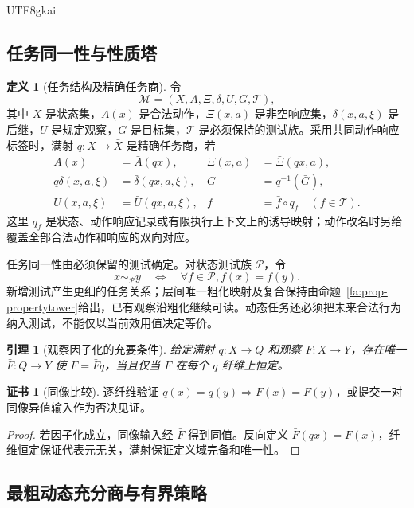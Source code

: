\documentclass[11pt,a4paper]{article}
\theoremstyle{plain}
\newtheorem{lemma}[theorem]{引理}
\theoremstyle{definition}
\newtheorem{definition}[theorem]{定义}
\newtheorem*{certificate}{证书}
\theoremstyle{remark}
\begin{document}
\begin{CJK*}{UTF8}{gkai}
\subsection{任务同一性与性质塔}

\begin{definition}[任务结构及精确任务商]
令
\[
 \mathcal M=(X,A,\Xi,\delta,U,G,\mathcal T),
\]
其中 $X$ 是状态集，$A(x)$ 是合法动作，$\Xi(x,a)$ 是非空响应集，$\delta(x,a,\xi)$ 是后继，$U$ 是规定观察，$G$ 是目标集，$\mathcal T$ 是必须保持的测试族。采用共同动作响应标签时，满射 $q:X\to\bar X$ 是精确任务商，若
\begin{equation}
\label{pc:eq-exact}
\begin{aligned}
 A(x)&=\bar A(qx),& \Xi(x,a)&=\bar\Xi(qx,a),\\
 q\delta(x,a,\xi)&=\bar\delta(qx,a,\xi),& G&=q^{-1}(\bar G),\\
 U(x,a,\xi)&=\bar U(qx,a,\xi),& f&=\bar f\circ q_f\quad(f\in\mathcal T).
\end{aligned}
\end{equation}
这里 $q_f$ 是状态、动作响应记录或有限执行上下文上的诱导映射；动作改名时另给覆盖全部合法动作和响应的双向对应。
\end{definition}

任务同一性由必须保留的测试确定。对状态测试族 $\mathcal P$，令
\[
 x\sim_{\mathcal P}y\quad\Longleftrightarrow\quad
 \forall f\in\mathcal P, f(x)=f(y).
\]
新增测试产生更细的任务关系；层间唯一粗化映射及复合保持由命题~\ref{fa:prop-propertytower}给出，已有观察沿粗化继续可读。动态任务还必须把未来合法行为纳入测试，不能仅以当前效用值决定等价。

\begin{lemma}[观察因子化的充要条件]
\label{pc:factorization}
给定满射 $q:X\to Q$ 和观察 $F:X\to Y$，存在唯一 $\bar F:Q\to Y$ 使 $F=\bar Fq$，当且仅当 $F$ 在每个 $q$ 纤维上恒定。
\end{lemma}
\begin{certificate}[同像比较]
逐纤维验证 $q(x)=q(y)\Rightarrow F(x)=F(y)$，或提交一对同像异值输入作为否决见证。
\end{certificate}
\begin{proof}
若因子化成立，同像输入经 $\bar F$ 得到同值。反向定义 $\bar F(qx)=F(x)$，纤维恒定保证代表元无关，满射保证定义域完备和唯一性。
\end{proof}

\subsection{最粗动态充分商与有界策略}


\end{CJK*}
\end{document}
